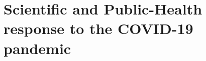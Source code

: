 \documentclass[nohyper,nobib,a4,12pt]{tufte-book} %
\begin{document}
\part{Scientific and Public-Health response to the COVID-19 pandemic}
  








\begin{fullwidth}
\printbibliography
\end{fullwidth}
\end{document}
